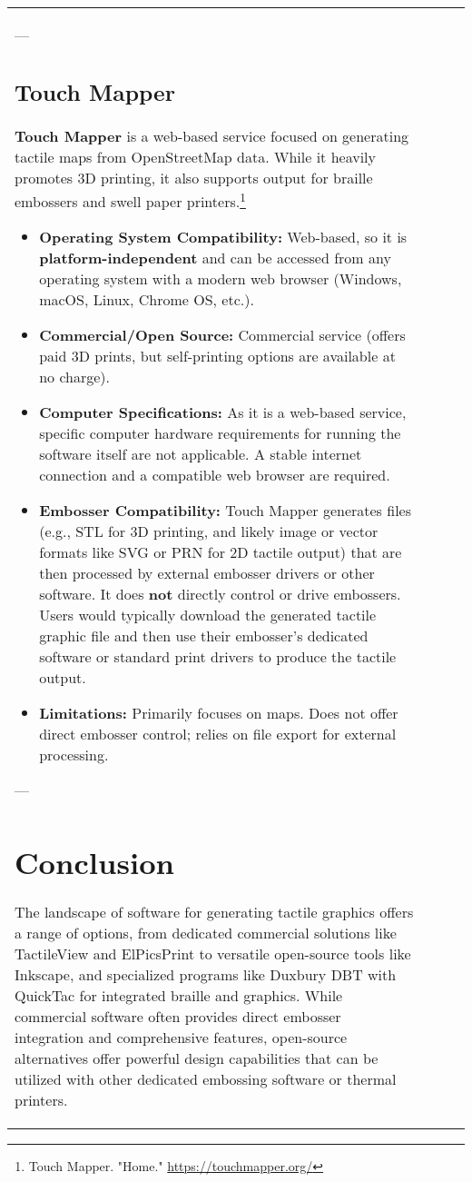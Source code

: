\begin{longtable}{|l|l|l|l|}
{---

\subsection{Touch Mapper}
\textbf{Touch Mapper} is a web-based service focused on generating tactile maps from OpenStreetMap data. While it heavily promotes 3D printing, it also supports output for braille embossers and swell paper printers.\footnote{Touch Mapper. "Home." \url{https://touchmapper.org/}}

\begin{itemize}
    \item \textbf{Operating System Compatibility:} Web-based, so it is \textbf{platform-independent} and can be accessed from any operating system with a modern web browser (Windows, macOS, Linux, Chrome OS, etc.).
    \item \textbf{Commercial/Open Source:} Commercial service (offers paid 3D prints, but self-printing options are available at no charge).
    \item \textbf{Computer Specifications:} As it is a web-based service, specific computer hardware requirements for running the software itself are not applicable. A stable internet connection and a compatible web browser are required.
    \item \textbf{Embosser Compatibility:} Touch Mapper generates files (e.g., STL for 3D printing, and likely image or vector formats like SVG or PRN for 2D tactile output) that are then processed by external embosser drivers or other software. It does \textbf{not} directly control or drive embossers. Users would typically download the generated tactile graphic file and then use their embosser's dedicated software or standard print drivers to produce the tactile output.
    \item \textbf{Limitations:} Primarily focuses on maps. Does not offer direct embosser control; relies on file export for external processing.
\end{itemize}

---

\section{Conclusion}
The landscape of software for generating tactile graphics offers a range of options, from dedicated commercial solutions like TactileView and ElPicsPrint to versatile open-source tools like Inkscape, and specialized programs like Duxbury DBT with QuickTac for integrated braille and graphics. While commercial software often provides direct embosser integration and comprehensive features, open-source alternatives offer powerful design capabilities that can be utilized with other dedicated embossing software or thermal printers.

}
\end{longtable}
